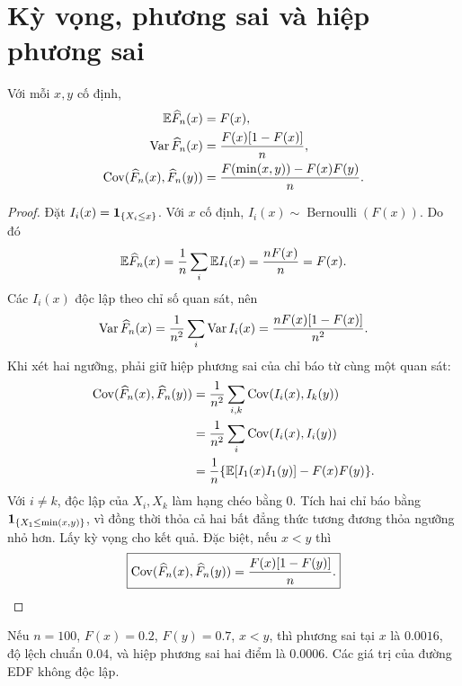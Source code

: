 \section{Kỳ vọng, phương sai và hiệp phương sai}
\begin{proposition}
Với mỗi $x,y$ cố định,
\begin{align*}
\mathbb E\widehat F_n(x)&=F(x),\\
\operatorname{Var}\widehat F_n(x)&=\frac{F(x)[1-F(x)]}{n},\\
\operatorname{Cov}(\widehat F_n(x),\widehat F_n(y))
&=\frac{F(\min(x,y))-F(x)F(y)}n.
\end{align*}
\end{proposition}
\begin{proof}
Đặt $I_i(x)=\mathbf 1_{\{X_i\leq x\}}$. Với $x$ cố định,
$I_i(x)\sim\operatorname{Bernoulli}(F(x))$. Do đó
\[
\mathbb E\widehat F_n(x)=\frac1n\sum_i\mathbb E I_i(x)=\frac{nF(x)}n=F(x).
\]
Các $I_i(x)$ độc lập theo chỉ số quan sát, nên
\[
\operatorname{Var}\widehat F_n(x)=\frac1{n^2}\sum_i\operatorname{Var} I_i(x)
=\frac{nF(x)[1-F(x)]}{n^2}.
\]
Khi xét hai ngưỡng, phải giữ hiệp phương sai của chỉ báo từ cùng một
quan sát:
\begin{align*}
\operatorname{Cov}(\widehat F_n(x),\widehat F_n(y))
&=\frac1{n^2}\sum_{i,k}\operatorname{Cov}(I_i(x),I_k(y))\\
&=\frac1{n^2}\sum_i\operatorname{Cov}(I_i(x),I_i(y))\\
&=\frac1n\{\mathbb E[I_1(x)I_1(y)]-F(x)F(y)\}.
\end{align*}
Với $i\ne k$, độc lập của $X_i,X_k$ làm hạng chéo bằng 0.
Tích hai chỉ báo bằng $\mathbf 1_{\{X_1\leq\min(x,y)\}}$, vì đồng thời thỏa
cả hai bất đẳng thức tương đương thỏa ngưỡng nhỏ hơn. Lấy kỳ vọng cho
kết quả. Đặc biệt, nếu $x<y$ thì
\[
\boxed{\operatorname{Cov}(\widehat F_n(x),\widehat F_n(y))=\frac{F(x)[1-F(y)]}{n}.}
\]
\end{proof}
\begin{example}
Nếu $n=100$, $F(x)=0.2$, $F(y)=0.7$, $x<y$, thì phương sai tại $x$
là $0.0016$, độ lệch chuẩn $0.04$, và hiệp phương sai hai điểm là
$0.0006$. Các giá trị của đường EDF không độc lập.
\end{example}

